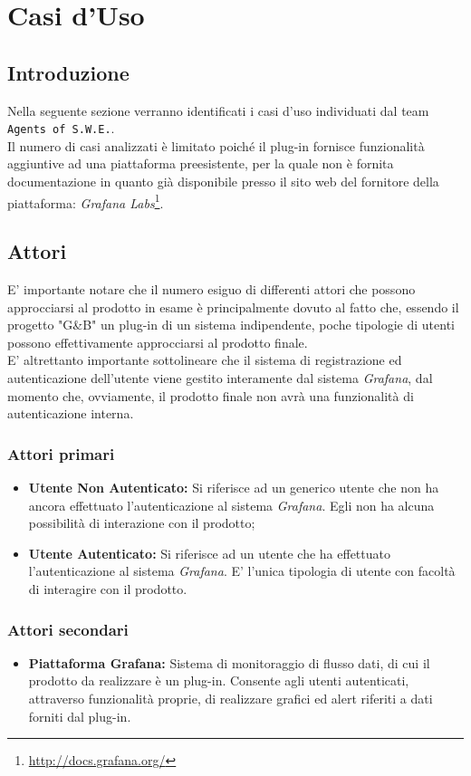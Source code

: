 \section{Casi d'Uso}\label{CasiUso}
\subsection{Introduzione}\label{CasiUso_Introduzione}
Nella seguente sezione verranno identificati i casi d'uso individuati dal team \texttt{Agents of S.W.E.}.\\
Il numero di casi analizzati è limitato poiché il plug-in fornisce funzionalità aggiuntive ad una piattaforma preesistente, per la quale non è fornita documentazione in quanto già disponibile presso il sito web del fornitore della piattaforma: \textit{Grafana Labs}\footnote{\url{http://docs.grafana.org/}}.

\subsection{Attori}\label{Attori}
E' importante notare che il numero esiguo di differenti attori che possono approcciarsi al prodotto in esame è principalmente dovuto al fatto che, essendo il progetto "G\&B" un plug-in di un sistema indipendente, poche tipologie di utenti possono effettivamente approcciarsi al prodotto finale.\\
E' altrettanto importante sottolineare che il sistema di registrazione ed autenticazione dell'utente viene gestito interamente dal sistema \textit{Grafana}, dal momento che, ovviamente, il prodotto finale non avrà una funzionalità di autenticazione interna.

\subsubsection*{Attori primari}
\begin{itemize}
\item \textbf{Utente Non Autenticato:} Si riferisce ad un generico utente che non ha ancora effettuato l'autenticazione al sistema \textit{Grafana}. Egli non ha alcuna possibilità di interazione con il prodotto;
\item \textbf{Utente Autenticato:} Si riferisce ad un utente che ha effettuato l'autenticazione al sistema \textit{Grafana}. E' l'unica tipologia di utente con facoltà di interagire con il prodotto.
\end{itemize}

\subsubsection*{Attori secondari}
\begin{itemize}
\item \textbf{Piattaforma Grafana:} Sistema di monitoraggio di flusso dati, di cui il prodotto da realizzare è un plug-in. Consente agli utenti autenticati, attraverso funzionalità proprie, di realizzare grafici ed alert riferiti a dati forniti dal plug-in.
\end{itemize}

